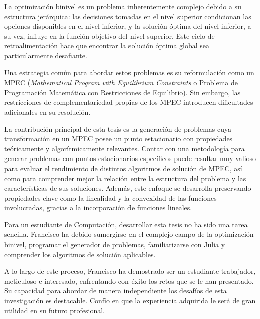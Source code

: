 \begin{opinion}
    La optimización binivel es un problema inherentemente complejo debido a su estructura jerárquica: las decisiones tomadas en el nivel superior condicionan las opciones disponibles en el nivel inferior, y la solución óptima del nivel inferior, a su vez, influye en la función objetivo del nivel superior. Este ciclo de retroalimentación hace que encontrar la solución óptima global sea particularmente desafiante.

Una estrategia común para abordar estos problemas es su reformulación como un MPEC (\textit{Mathematical Program with Equilibrium Constraints} o Problema de Programación Matemática con Restricciones de Equilibrio). Sin embargo, las restricciones de complementariedad propias de los MPEC introducen dificultades adicionales en su resolución.

La contribución principal de esta tesis es la generación de problemas cuya transformación en un MPEC posee un punto estacionario con propiedades teóricamente y algorítmicamente relevantes. Contar con una metodología para generar problemas con puntos estacionarios específicos puede resultar muy valioso para evaluar el rendimiento de distintos algoritmos de solución de MPEC, así como para comprender mejor la relación entre la estructura del problema y las características de sus soluciones. Además, este enfoque se desarrolla preservando propiedades clave como la linealidad y la convexidad de las funciones involucradas, gracias a la incorporación de funciones lineales.

Para un estudiante de Computación, desarrollar esta tesis no ha sido una tarea sencilla. Francisco ha debido sumergirse en el complejo campo de la optimización binivel, programar el generador de problemas, familiarizarse con Julia y comprender los algoritmos de solución aplicables.

A lo largo de este proceso, Francisco ha demostrado ser un estudiante trabajador, meticuloso e interesado, enfrentando con éxito los retos que se le han presentado. Su capacidad para abordar de manera independiente los desafíos de esta investigación es destacable. Confío en que la experiencia adquirida le será de gran utilidad en su futuro profesional.
\end{opinion}